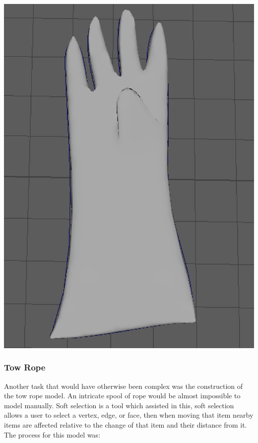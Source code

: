 \documentclass[ %
                    author={Elis Jones},
                supervisor={Dr. Kirsten Cater},
                    degree={BSc},
                     title={The Effect of Presentation Medium on Spatial Cognition},
                  subtitle={in the Virtual Environment},
                      year={2018} ]{dissertation}
\begin{document}
\begin{minipage}{\textwidth}
\begin{center}
\begin{minipage}{0.18\textwidth}
    \end{minipage}\hfill
    \begin{minipage}{0.18\textwidth}
        \centering
        \includegraphics[width=1\textwidth]{images/adddivision.png}
    \end{minipage}\hfill
\end{center}
\label{gloves}
\end{minipage}

\subsubsection{Tow Rope}
Another task that would have otherwise been complex was the construction of the tow rope model. An intricate spool of rope would be almost impossible to model manually. Soft selection is a tool which assisted in this, soft selection allows a user to select a vertex, edge, or face, then when moving that item nearby items are affected relative to the change of that item and their distance from it. The process for this model was: 
\end{document}
